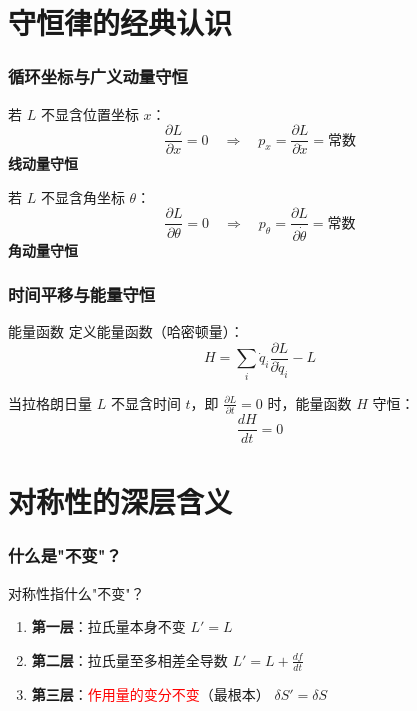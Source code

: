 \documentclass[xcolor=dvipsnames]{ctexbeamer}
\begin{document}
\section{守恒律的经典认识}

\begin{frame}
\frametitle{循环坐标与广义动量守恒}
\begin{example}[空间平移]
若 $L$ 不显含位置坐标 $x$：
$$\frac{\partial L}{\partial x} = 0 \quad \Rightarrow \quad p_x = \frac{\partial L}{\partial \dot{x}} = \text{常数}$$
\textbf{线动量守恒}
\end{example}

\pause

\begin{example}[旋转]
若 $L$ 不显含角坐标 $\theta$：
$$\frac{\partial L}{\partial \theta} = 0 \quad \Rightarrow \quad p_\theta = \frac{\partial L}{\partial \dot{\theta}} = \text{常数}$$
\textbf{角动量守恒}
\end{example}
\end{frame}

\begin{frame}
\frametitle{时间平移与能量守恒}
\begin{block}{能量函数}
定义能量函数（哈密顿量）：
$$H = \sum_i \dot{q}_i \frac{\partial L}{\partial \dot{q}_i} - L$$
\end{block}

\pause

\begin{theorem}
当拉格朗日量 $L$ 不显含时间 $t$，即 $\frac{\partial L}{\partial t} = 0$ 时，能量函数 $H$ 守恒：
$$\frac{dH}{dt} = 0$$
\end{theorem}
\end{frame}

\section{对称性的深层含义}

\begin{frame}
\frametitle{什么是"不变"？}
\begin{center}
\Large 对称性指什么"不变"？
\end{center}

\pause

\begin{enumerate}
\item \textbf{第一层}：拉氏量本身不变 \quad $L' = L$
\pause
\item \textbf{第二层}：拉氏量至多相差全导数 \quad $L' = L + \frac{df}{dt}$
\pause
\item \textbf{第三层}：\textcolor{red}{作用量的变分不变}（最根本） \quad $\delta S' = \delta S$
\end{enumerate}
\end{frame}
\end{document}
